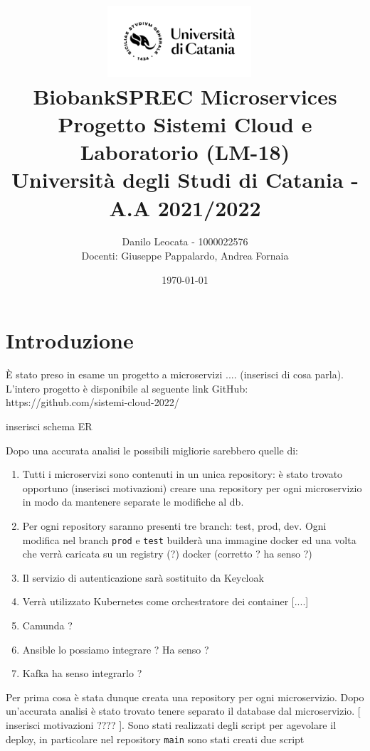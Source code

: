 \documentclass[11pt]{article}
\title{ %
\includegraphics[width=0.4\textwidth]{UniCT-Logo-Nero}~\\
BiobankSPREC Microservices \\ 
\large Progetto Sistemi Cloud e Laboratorio (LM-18) \\ Università degli Studi di Catania - A.A 2021/2022 \\
}
\author{ Danilo Leocata - 1000022576 \\ Docenti: Giuseppe Pappalardo, Andrea Fornaia}
\date{\today}
\begin{document}
\maketitle	
\pagebreak


\section{Introduzione}

È stato preso in esame un progetto a microservizi .... (inserisci di cosa parla). L'intero progetto è disponibile al seguente link GitHub:
https://github.com/sistemi-cloud-2022/

\begin{center}
    inserisci schema ER
\end{center}

Dopo una accurata analisi le possibili migliorie sarebbero quelle di:

\begin{enumerate}
    \item {
        Tutti i microservizi sono contenuti in un unica repository: è stato trovato opportuno (inserisci motivazioni) creare una repository per ogni microservizio
        in modo da mantenere separate le modifiche al db.
    }

    \item {
        Per ogni repository saranno presenti tre branch: test, prod, dev. Ogni modifica nel branch \texttt{prod} e \texttt{test} builderà una immagine docker ed una volta
        che verrà caricata su un registry (?) docker (corretto ? ha senso ?)
    }

    \item {
        Il servizio di autenticazione sarà sostituito da Keycloak
    }

    \item {
        Verrà utilizzato Kubernetes come orchestratore dei container [....]
    }
    
    \item {
        Camunda ?
    }

    \item {
        Ansible lo possiamo integrare ? Ha senso ? 
    }

    \item {
        Kafka ha senso integrarlo ? 
    }
    

\end{enumerate}

Per prima cosa è stata dunque creata una repository per ogni microservizio. Dopo un'accurata analisi è stato trovato tenere separato
il database dal microservizio. [ inserisci motivazioni ???? ]. Sono stati realizzati degli script per agevolare il deploy, in particolare nel repository \texttt{main} sono stati
creati due script
\end{document}
